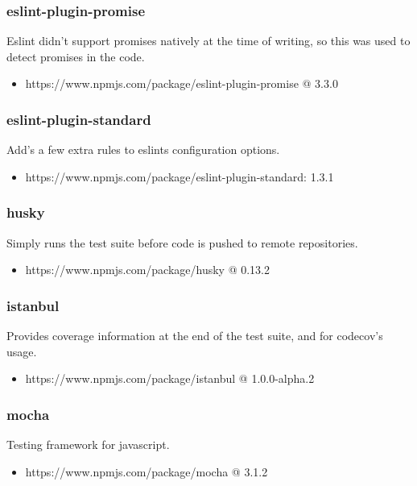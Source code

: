   \subsubsection{eslint-plugin-promise}
  Eslint didn't support promises natively at the time of writing, so this was used to detect promises in the code.
  \begin{itemize}
    \item https://www.npmjs.com/package/eslint-plugin-promise @ 3.3.0
  \end{itemize}

  \subsubsection{eslint-plugin-standard}
  Add's a few extra rules to eslints configuration options.
  \begin{itemize}
    \item https://www.npmjs.com/package/eslint-plugin-standard: 1.3.1
  \end{itemize}

  \subsubsection{husky}
  Simply runs the test suite before code is pushed to remote repositories.
  \begin{itemize}
    \item https://www.npmjs.com/package/husky @ 0.13.2
  \end{itemize}

  \subsubsection{istanbul}
  Provides coverage information at the end of the test suite, and for codecov's usage.
  \begin{itemize}
    \item https://www.npmjs.com/package/istanbul @ 1.0.0-alpha.2
  \end{itemize}

  \subsubsection{mocha}
  Testing framework for javascript.
  \begin{itemize}
    \item https://www.npmjs.com/package/mocha @ 3.1.2
  \end{itemize}

